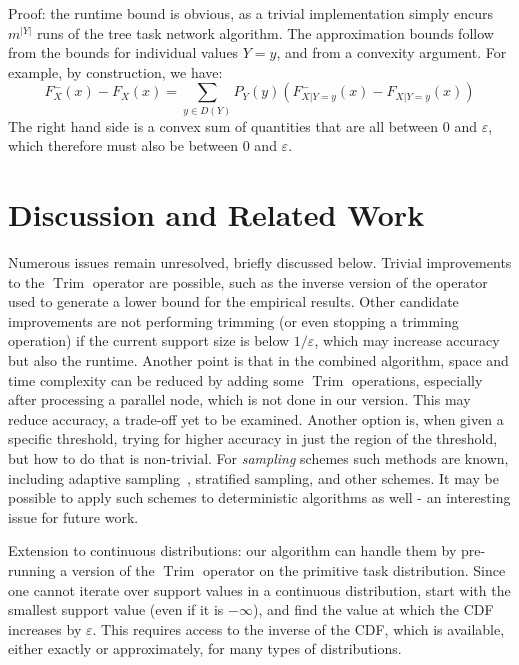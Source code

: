\documentclass{article}
\DeclareMathOperator{\Trim}{Trim}
\begin{document}
Proof: the runtime bound is obvious, as a trivial implementation simply encurs $m^{|Y|}$
runs of the tree task network algorithm. The approximation bounds follow
from the bounds for individual values $Y=y$, and from a convexity argument.
For example, by construction, we have:
\[
F^-_{X}(x) -  F_{X}(x) =  \sum_{y\in D(Y)} P_{Y}(y)(F^-_{X|Y=y}(x) - F_{X|Y=y}(x))
\]
The right hand side is a convex sum of quantities that are all between 0 and $\varepsilon$, which therefore
must also be between 0 and $\varepsilon$.

\section{Discussion and Related Work}\label{sec:discussion}

Numerous issues remain unresolved, briefly discussed below.
Trivial improvements to the $\Trim$ operator are possible, such as the inverse version of the operator used to
generate a lower bound for the empirical results. Other candidate improvements are not performing trimming
(or even stopping a trimming operation) if the current support size is below $1/\varepsilon$, which may increase accuracy but also
the runtime. Another point is that in the combined algorithm, space and time complexity can be reduced by adding some $\Trim$ operations,
especially after processing a parallel node, which is not done in our version. This may reduce accuracy, 
a trade-off yet to be examined.
Another option is, when given a specific threshold, trying for higher accuracy in just the region of the
threshold, but how to do that is non-trivial. For {\em sampling} schemes such methods are known, including adaptive 
sampling~\cite{bucher1988adaptive,lipton1990practical},
stratified sampling, and other schemes.
It may be possible to apply such schemes to deterministic algorithms as well - an interesting issue for future work.

Extension to continuous distributions: our algorithm can handle them by
pre-running a version of the $\Trim$ operator on the primitive task distribution. Since one cannot iterate over support values
in a continuous distribution, start with the smallest support value (even if it is $- \infty$), and find the value at which the CDF
increases by $\varepsilon$. This requires access to the inverse of the CDF, which is available, either exactly or approximately,
for many types of distributions. %
\end{document}
